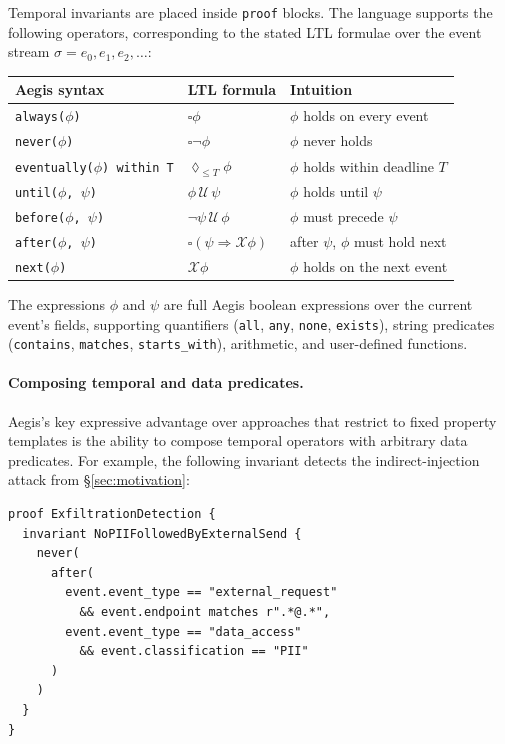 \documentclass[sigconf]{acmart}
\begin{document}
Temporal invariants are placed inside \texttt{proof} blocks. The language
supports the following operators, corresponding to the stated LTL formulae over
the event stream $\sigma = e_0, e_1, e_2, \ldots$:

\begin{center}
\begin{tabular}{lll}
\toprule
Aegis syntax & LTL formula & Intuition \\
\midrule
\texttt{always($\phi$)} & $\square\phi$ & $\phi$ holds on every event \\
\texttt{never($\phi$)} & $\square\neg\phi$ & $\phi$ never holds \\
\texttt{eventually($\phi$) within T} & $\lozenge_{\leq T}\phi$ & $\phi$ holds within deadline $T$ \\
\texttt{until($\phi$, $\psi$)} & $\phi \,\mathcal{U}\, \psi$ & $\phi$ holds until $\psi$ \\
\texttt{before($\phi$, $\psi$)} & $\neg\psi \,\mathcal{U}\, \phi$ & $\phi$ must precede $\psi$ \\
\texttt{after($\phi$, $\psi$)} & $\square(\psi \Rightarrow \mathcal{X}\phi)$ & after $\psi$, $\phi$ must hold next \\
\texttt{next($\phi$)} & $\mathcal{X}\phi$ & $\phi$ holds on the next event \\
\bottomrule
\end{tabular}
\end{center}

\noindent The expressions $\phi$ and $\psi$ are full Aegis boolean expressions
over the current event's fields, supporting quantifiers (\texttt{all},
\texttt{any}, \texttt{none}, \texttt{exists}), string predicates
(\texttt{contains}, \texttt{matches}, \texttt{starts\_with}), arithmetic, and
user-defined functions.

\paragraph{Composing temporal and data predicates.}
Aegis's key expressive advantage over approaches that restrict to fixed property
templates is the ability to compose temporal operators with arbitrary data
predicates. For example, the following invariant detects the indirect-injection
attack from \S\ref{sec:motivation}:

\begin{lstlisting}[caption={Sequence-level exfiltration detection.},label={lst:seq}]
proof ExfiltrationDetection {
  invariant NoPIIFollowedByExternalSend {
    never(
      after(
        event.event_type == "external_request"
          && event.endpoint matches r".*@.*",
        event.event_type == "data_access"
          && event.classification == "PII"
      )
    )
  }
}
\end{lstlisting}
\end{document}
